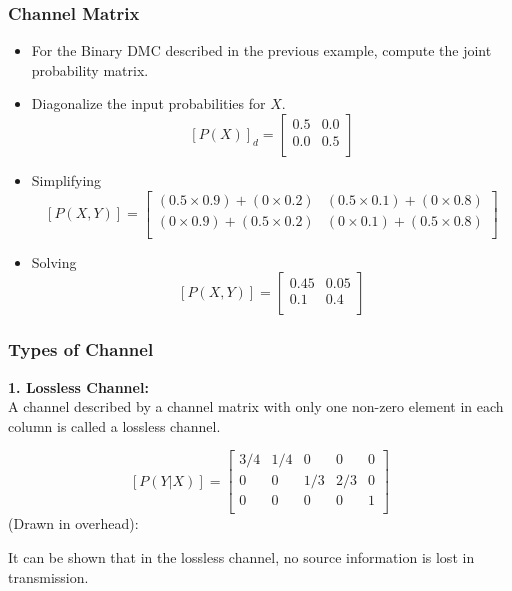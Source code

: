 \documentclass[a4]{beamer}
\begin{document}
\begin{frame}
\frametitle{Channel Matrix}
\begin{itemize}
\item For the Binary DMC described in the previous example, compute the joint probability matrix.
\item Diagonalize the input probabilities for $X$.
\[  [P(X)]_d  = \left[ \begin{array}{cc}
0.5 & 0.0  \\
0.0 & 0.5\\
\end{array} \right] \]

\item Simplifying
\[  [P(X,Y)]  =  \left[ \begin{array}{cc}
(0.5 \times 0.9)+(0 \times 0.2) & (0.5 \times 0.1)+(0 \times 0.8) \\
(0 \times 0.9)+(0.5 \times 0.2) & (0 \times 0.1)+(0.5 \times 0.8) \\
\end{array} \right]  \]


\item Solving
\[  [P(X,Y)]  =  \left[ \begin{array}{cc}
0.45 & 0.05 \\
0.1  & 0.4 \\
\end{array} \right]  \]
\end{itemize}
\end{frame}
\begin{frame}
\frametitle{Types of Channel}
\textbf{ 1. Lossless Channel:}\\
A channel described by a channel matrix with only one non-zero element in each column is called a lossless channel.


\[  [P(Y|X)]  =  \left[ \begin{array}{ccccc}
3/4 & 1/4 &0 & 0&0\\
0  & 0 &1/3 & 2/3& 0\\
0  & 0& 0&0 &1 \\
\end{array} \right]  \]
(Drawn in overhead):\\ \bigskip

It can be shown that in the lossless channel, no source information is lost in transmission.
\end{frame}
\end{document}
